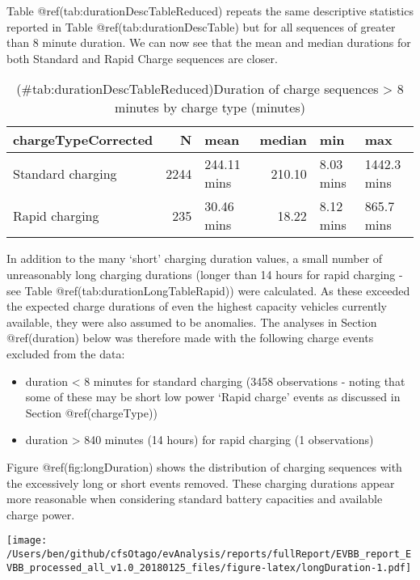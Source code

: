 \documentclass[]{article}
\providecommand{\tightlist}{%
  \setlength{\itemsep}{0pt}\setlength{\parskip}{0pt}}
\begin{document}
Table @ref(tab:durationDescTableReduced) repeats the same descriptive statistics reported in Table @ref(tab:durationDescTable) but for all sequences of greater than 8 minute duration. We can now see that the mean and median durations for both Standard and Rapid Charge sequences are closer.

\begin{table}[t]

\caption{(\#tab:durationDescTableReduced)Duration of charge sequences > 8 minutes by charge type (minutes)}
\centering
\begin{tabular}{l|r|l|r|l|l}
\hline
chargeTypeCorrected & N & mean & median & min & max\\
\hline
Standard charging & 2244 & 244.11 mins & 210.10 & 8.03 mins & 1442.3 mins\\
\hline
Rapid charging & 235 & 30.46 mins & 18.22 & 8.12 mins & 865.7 mins\\
\hline
\end{tabular}
\end{table}

In addition to the many `short' charging duration values, a small number of unreasonably long charging durations (longer than 14 hours for rapid charging - see Table @ref(tab:durationLongTableRapid)) were calculated. As these exceeded the expected charge durations of even the highest capacity vehicles currently available, they were also assumed to be anomalies. The analyses in Section @ref(duration) below was therefore made with the following charge events excluded from the data:

\begin{itemize}
\tightlist
\item
  duration \textless{} 8 minutes for standard charging (3458 observations - noting that some of these may be short low power `Rapid charge' events as discussed in Section @ref(chargeType))
\item
  duration \textgreater{} 840 minutes (14 hours) for rapid charging (1 observations)
\end{itemize}

Figure @ref(fig:longDuration) shows the distribution of charging sequences with the excessively long or short events removed. These charging durations appear more reasonable when considering standard battery capacities and available charge power.

\texttt{[image: /Users/ben/github/cfsOtago/evAnalysis/reports/fullReport/EVBB\_report\_EVBB\_processed\_all\_v1.0\_20180125\_files/figure-latex/longDuration-1.pdf]}
\end{document}
